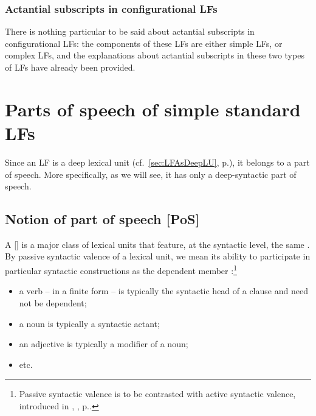 \endgroup

\subsubsection{Actantial subscripts in configurational LFs}

There is nothing  particular to be said about actantial subscripts in configurational LFs: the components of these LFs are either simple LFs, or complex LFs, and the explanations about actantial subscripts in these two types of LFs have already been provided.

\section{Parts of speech of simple standard LFs}\label{sec:PofS}

Since an LF is a deep lexical unit (cf.~\ref{sec:LFAsDeepLU}, p.\thinspace\pageref{sec:LFAsDeepLU}), it belongs to a part of speech. More specifically, as we will see, it has only a deep-syntactic part of speech.

\subsection{Notion of part of speech [PoS]}\label{sec:notionPdD}

A  [] is a major class of lexical units that feature, at the syntactic level, the same . By passive syntactic valence of a lexical unit, we mean its ability to participate in particular syntactic constructions as the dependent member \parencite[109]{Melcuk2015a-e}:\footnote{Passive syntactic valence is to be contrasted with active syntactic valence, introduced in , , p.\thinspace\pageref{para:activeSyntacticValence}.}

\begin{itemize}

\item a verb -- in a finite form -- is typically the syntactic head of a clause and need not be dependent;
\item a noun is typically a syntactic actant;
\item an adjective is typically a modifier of a noun;
\item etc.

\end{itemize}

